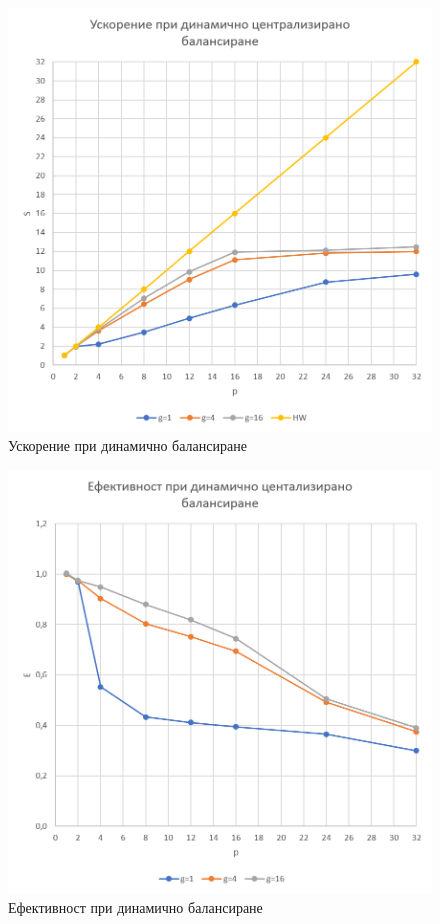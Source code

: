 \documentclass[a4paper,11pt]{article}
\begin{document}
\begin{figure}[H]
    \centering
    \includegraphics[width=0.9\linewidth]{images/DynamicMandelSpeedup.png}
    \caption{Ускорение при динамично балансиране}
    \label{fig:dynamic-speedup}
\end{figure}
\begin{figure}[H]
    \centering
    \includegraphics[width=0.9\linewidth]{images/DynamicMandelEffectiveness.png}
    \caption{Ефективност при динамично балансиране}
    \label{fig:dynamic-effectiveness}
\end{figure}
\end{document}
